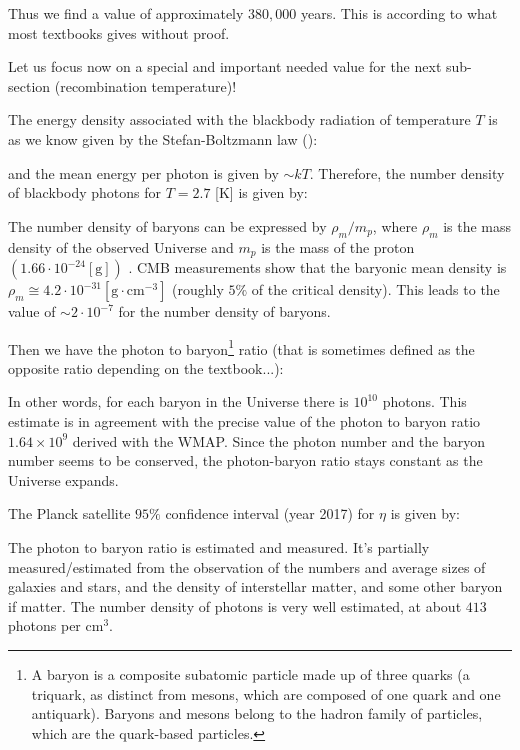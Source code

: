 	 Thus we find a value of approximately $380,000$ years. This is according to what most textbooks gives without proof.
	 
	Let us focus now on a special and important needed value for the next sub-section (recombination temperature)!
	
	The energy density associated with the blackbody radiation of temperature $T$ is as we know given by the Stefan-Boltzmann law ():
	
	and the mean energy per photon is given by $\sim kT$. Therefore, the number density of blackbody photons for $T=2.7$ [K] is given by: 
	
	The number density of baryons can be expressed by $\rho_{m} / m_{p}$, where $\rho_m$ is the mass density of the observed Universe and $m_p$ is the mass of the proton $\left(1.66 \cdot 10^{-24} [\mathrm{g}]\right)$ . CMB measurements show that the baryonic mean density is $\rho_{m}\cong 4.2 \cdot 10^{-31} [\text{g} \cdot\text{cm}^{-3}]$ (roughly $5\%$ of the critical density). This leads to the value of $\sim 2 \cdot 10^{-7}$ for the number density of baryons.
	
	Then we have the photon to baryon\footnote{A baryon is a composite subatomic particle made up of three quarks (a triquark, as distinct from mesons, which are composed of one quark and one antiquark). Baryons and mesons belong to the hadron family of particles, which are the quark-based particles.} ratio\label{photon to baryon ratio} (that is sometimes defined as the opposite ratio depending on the textbook...):
	
	In other words, for each baryon in the Universe there is $10^{10}$ photons. This estimate is in agreement with the precise value of the photon to baryon ratio $1.64 \times 10^{9}$ derived with the WMAP. Since the photon number and the baryon number seems to be conserved, the photon-baryon ratio stays constant as the Universe expands.
	
	The Planck satellite $95\%$ confidence interval (year 2017) for $\eta$ is given by:
	
	
	\begin{tcolorbox}[title=Remark,colframe=black,arc=10pt]
	The photon to baryon ratio is estimated and measured. It's partially measured/estimated from the observation of the numbers and average sizes of galaxies and stars, and the density of interstellar matter, and some other baryon if matter. The number density of photons is very well estimated, at about $413$ photons per $\text{cm}^3$.
	\end{tcolorbox}
	
